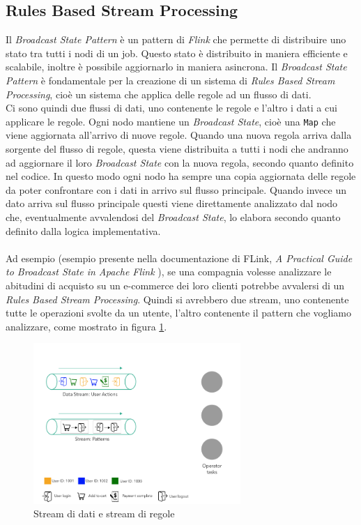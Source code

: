 \subsection{Rules Based Stream Processing}
\label{subsec:RulesBasedStreamProcessing}
Il \textit{Broadcast State Pattern} è un pattern di \textit{Flink} che permette di distribuire uno stato tra tutti i nodi di un job.
Questo stato è distribuito in maniera efficiente e scalabile, inoltre è possibile aggiornarlo in maniera asincrona.
Il \textit{Broadcast State Pattern} è fondamentale per la creazione di un sistema di \textit{Rules Based Stream Processing}, 
cioè un sistema che applica delle regole ad un flusso di dati.\\
Ci sono quindi due flussi di dati, uno contenente le regole e l'altro i dati a cui applicare le regole.
Ogni nodo mantiene un \textit{Broadcast State}, cioè una \texttt{Map} che viene aggiornata all'arrivo di nuove regole.
Quando una nuova regola arriva dalla sorgente del flusso di regole, questa viene distribuita a tutti i nodi che andranno ad aggiornare il loro \textit{Broadcast State}
con la nuova regola, secondo quanto definito nel codice. In questo modo ogni nodo ha sempre una copia aggiornata delle regole da poter confrontare con i dati in arrivo sul flusso principale.
Quando invece un dato arriva sul flusso principale questi viene direttamente analizzato dal nodo che, eventualmente avvalendosi del \textit{Broadcast State}, lo elabora 
secondo quanto definito dalla logica implementativa.\\\\
Ad esempio (esempio presente nella documentazione di FLink, \textit{A Practical Guide to Broadcast State in Apache Flink} \cite{:w
broadcastStatePatternGuide}),
se una compagnia volesse analizzare le abitudini di acquisto su un e-commerce dei loro clienti 
potrebbe avvalersi di un \textit{Rules Based Stream Processing}. Quindi si avrebbero due stream, uno contenente tutte le operazioni svolte da un utente,
l'altro contenente il pattern che vogliamo analizzare, come mostrato in figura \ref{fig:broadcastState1}.
\begin{figure}[htpb]
    \centering
    \includegraphics[width=0.7\textwidth]{images/EventExport/broadcastState1.png}
    \caption{Stream di dati e stream di regole}
    \label{fig:broadcastState1}
\end{figure}
